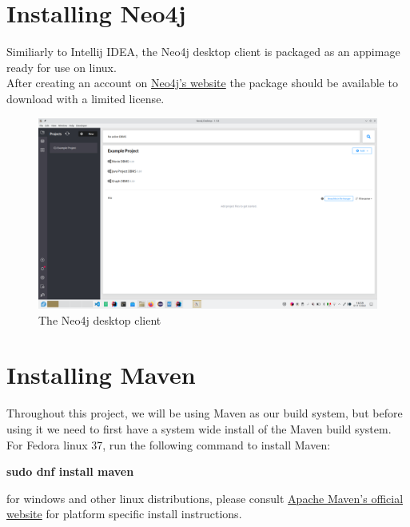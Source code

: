\documentclass[]{report}
\begin{document}
	\section{Installing Neo4j}
	Similiarly to Intellij IDEA, the Neo4j desktop client is packaged as an appimage ready for use on linux.\\
	After creating an account on \href{https://neo4j.com/product/developer-tools/}{Neo4j's website} the package should be available to download with a limited license.\\
	\begin{figure}[!htb]
		\centering
		\includegraphics[width=1\textwidth]{neo4j_desktop.png}
		\caption{The Neo4j desktop client}
	\end{figure}
	\newpage
	\section{Installing Maven}
	Throughout this project, we will be using Maven as our build system, but before using it we need to first have a system wide install of the Maven build system.\\
	For Fedora linux 37, run the following command to install Maven:
	\begin{center}
	 \textbf{sudo dnf install maven}
	\end{center}
	for windows and other linux distributions, please consult \href{https://maven.apache.org/}{Apache Maven's official website} for platform specific install instructions.
	\newpage
\end{document}
